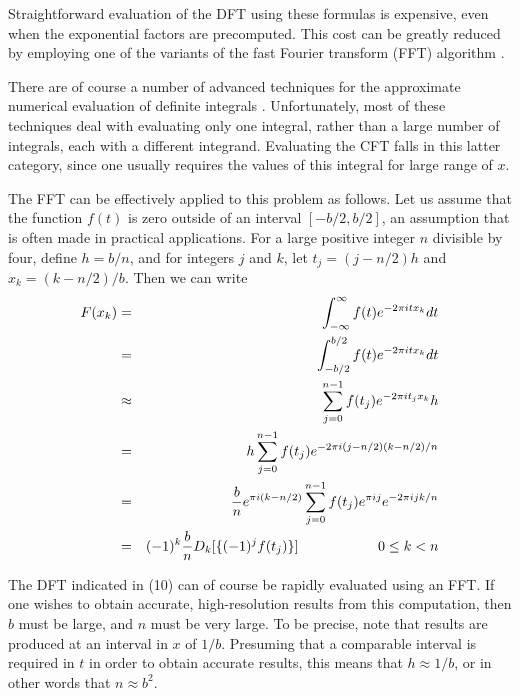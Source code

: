 Straightforward evaluation of the DFT using these formulas is expensive,
even when the exponential factors are precomputed.  This cost can be
greatly reduced by employing one of the variants of the fast Fourier
transform (FFT) algorithm \cite{dhb-fft1,dhb-fft2,swarz-fft,vanloan}.

\vspace{2ex}

There are of course a number of advanced techniques for the
approximate numerical evaluation of definite integrals \cite{davis}.
Unfortunately, most of these techniques deal with evaluating only one
integral, rather than a large number of integrals, each with a
different integrand.  Evaluating the CFT falls in this latter
category, since one usually requires the values of this integral for
large range of $x$.

The FFT can be effectively applied to this problem as follows.  Let us
assume that the function $f(t)$ is zero outside of an interval $[-b/2,
b/2]$, an assumption that is often made in practical applications.
For a large positive integer $n$ divisible by four, define $h = b /
n$, and for integers $j$ and $k$, let $t_j = (j - n / 2) h$ and $x_k =
(k - n / 2)/ b$.  Then we can write
\begin{eqnarray}
F(x_k) &=& \int _{-\infty} ^\infty f(t) e^{-2 \pi i t x_k} dt \\
     &=& \int _{-b/2} ^{b/2} f(t) e^{-2 \pi i t x_k} dt \\
     &\approx& \sum _{j = 0} ^{n - 1} f(t_j) e^{-2 \pi i t_j x_k} h \\
     &=& h \sum _{j = 0} ^{n - 1} f(t_j) e^{-2 \pi i (j - n / 2) 
       (k - n / 2) / n} \\
     &=& \frac{b}{n} e^{\pi i (k - n / 2)} \sum _{j = 0} ^{n - 1} 
       f(t_j) e^{\pi i j} e^{-2 \pi i j k / n} \\
     &=& (-1)^k \frac{b}{n} D_k [\{ (-1)^j f(t_j) \}] \hspace{20mm} 
       0 \leq k < n
\end{eqnarray}

The DFT indicated in (10) can of course be rapidly evaluated using an
FFT.  If one wishes to obtain accurate, high-resolution results from
this computation, then $b$ must be large, and $n$ must be very large.
To be precise, note that results are produced at an interval in $x$ of
$1 / b$.  Presuming that a comparable interval is required in $t$ in
order to obtain accurate results, this means that $h \approx 1 / b$,
or in other words that $n \approx b^2$.

